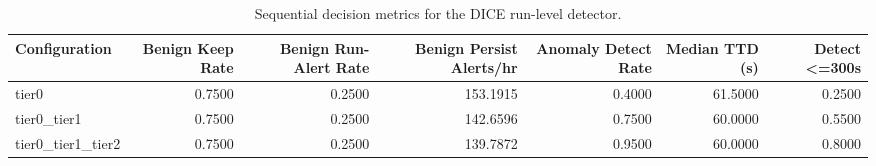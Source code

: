 \begin{table}[t]
\centering
\caption{Sequential decision metrics for the DICE run-level detector.}
\label{tab:dice_sequential_metrics}
\footnotesize
\begin{tabular}{lrrrrrr}
\toprule
Configuration & Benign Keep Rate & Benign Run-Alert Rate & Benign Persist Alerts/hr & Anomaly Detect Rate & Median TTD (s) & Detect <=300s \\
\midrule
tier0 & 0.7500 & 0.2500 & 153.1915 & 0.4000 & 61.5000 & 0.2500 \\
tier0_tier1 & 0.7500 & 0.2500 & 142.6596 & 0.7500 & 60.0000 & 0.5500 \\
tier0_tier1_tier2 & 0.7500 & 0.2500 & 139.7872 & 0.9500 & 60.0000 & 0.8000 \\
\bottomrule
\end{tabular}

\end{table}
